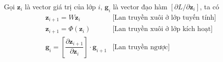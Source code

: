 Gọi $\mathbf z_i$ là vector giá trị của lớp $i$, $\mathbf g_i$ là vector đạo hàm $[\partial L/\partial\mathbf z_i]$, ta có
\begin{align}
     & \mathbf z_{i+1}=W\mathbf z_i                                                                      & \text{[Lan truyền xuôi ở lớp tuyến tính]} \\
     & \mathbf z_{i+1}=\Phi(\mathbf z_i)                                                                 & \text{[Lan truyền xuôi ở lớp kích hoạt]}  \\
     & \mathbf g_i=\left[\dfrac{\partial\mathbf z_{i+1}}{\partial\mathbf z_i}\right]\cdot\mathbf g_{i+1} & \text{[Lan truyền ngược]}                 %
\end{align}

